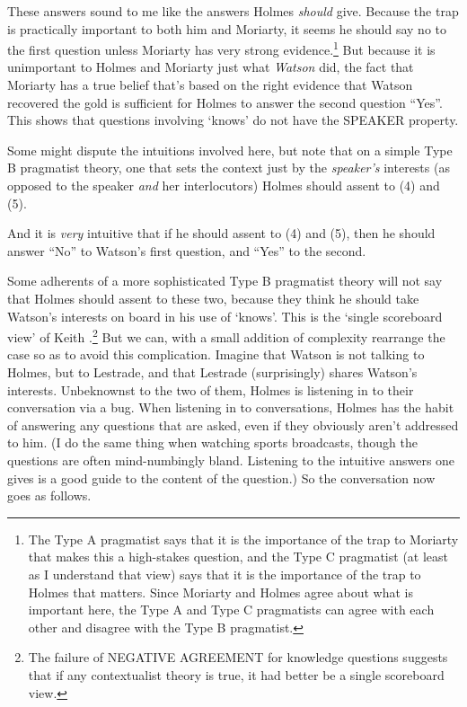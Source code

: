 These answers sound to me like the answers Holmes \textit{should} give. Because the trap is practically important to both him and Moriarty, it seems he should say no to the first question unless Moriarty has very strong evidence.\footnote{The Type A pragmatist says that it is the importance of the trap to Moriarty that makes this a high-stakes question, and the Type C pragmatist (at least as I understand that view) says that it is the importance of the trap to Holmes that matters. Since Moriarty and Holmes agree about what is important here, the Type A and Type C pragmatists can agree with each other and disagree with the Type B pragmatist.} But because it is unimportant to Holmes and Moriarty just what \textit{Watson} did, the fact that Moriarty has a true belief that's based on the right evidence that Watson recovered the gold is sufficient for Holmes to answer the second question ``Yes''. This shows that questions involving `knows' do not have the SPEAKER property.

Some might dispute the intuitions involved here, but note that on a simple Type B pragmatist theory, one that sets the context just by the \textit{speaker's} interests (as opposed to the speaker \textit{and} her interlocutors) Holmes should assent to (4) and (5).


\noindent And it is \textit{very} intuitive that if he should assent to (4) and (5), then he should answer ``No'' to Watson's first question, and ``Yes'' to the second.

Some adherents of a more sophisticated Type B pragmatist theory will not say that Holmes should assent to these two, because they think he should take Watson's interests on board in his use of `knows'. This is the `single scoreboard view' of Keith \citet{DeRose2004}.\footnote{The failure of NEGATIVE AGREEMENT for knowledge questions suggests that if any contextualist theory is true, it had better be a single scoreboard view. } But we can, with a small addition of complexity rearrange the case so as to avoid this complication. Imagine that Watson is not talking to Holmes, but to Lestrade, and that Lestrade (surprisingly) shares Watson's interests. Unbeknownst to the two of them, Holmes is listening in to their conversation via a bug. When listening in to conversations, Holmes has the habit of answering any questions that are asked, even if they obviously aren't addressed to him. (I do the same thing when watching sports broadcasts, though the questions are often mind-numbingly bland. Listening to the intuitive answers one gives is a good guide to the content of the question.) So the conversation now goes as follows.

